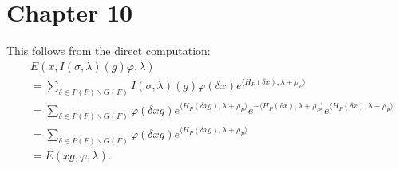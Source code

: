 \newpage
\section{Chapter 10}

\begin{problem} \notfinish
\end{problem}

\begin{problem} \notfinish
\end{problem}

\begin{problem} This follows from the direct computation:
\begin{align*}
    &E(x, I(\sigma, \lambda)(g)\varphi, \lambda) \\
    &= \sum_{\delta \in P(F) \backslash G(F)} I(\sigma, \lambda)(g)\varphi(\delta x)
    e^{\langle H_P(\delta x), \lambda + \rho_P \rangle} \\
    &= \sum_{\delta \in P(F) \backslash G(F)} \varphi(\delta x g ) e^{\langle H_P(\delta x g), \lambda + \rho_P \rangle}e^{-\langle H_P(\delta x), \lambda + \rho_P \rangle} e^{\langle H_P(\delta x), \lambda + \rho_P \rangle}\\
    &= \sum_{\delta \in P(F) \backslash G(F)} \varphi(\delta x g ) e^{\langle H_P(\delta x g), \lambda + \rho_P \rangle} \\
    &= E(xg, \varphi, \lambda).
\end{align*}
\end{problem}

\begin{problem} \notfinish
\end{problem}

\begin{problem} \notfinish
\end{problem}

\begin{problem} \notfinish
\end{problem}

\begin{problem} \notfinish
\end{problem}

\begin{problem} \notfinish
\end{problem}

\begin{problem} \notfinish
\end{problem}